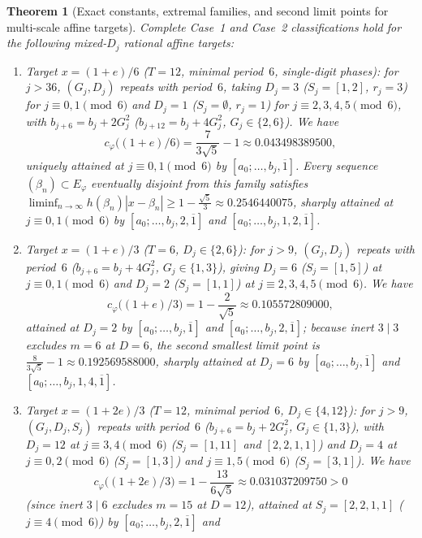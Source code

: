 \documentclass[11pt]{amsart}
\newtheorem{theorem}{Theorem}[section]
\theoremstyle{definition}
\theoremstyle{remark}
\numberwithin{equation}{section}
\begin{document}
\begin{theorem}[Exact constants, extremal families, and second limit points for multi-scale affine targets]\label{thm:golden-multiscale-exact}
Complete Case~1 and Case~2 classifications hold for the following mixed-$D_j$
rational affine targets:
\begin{enumerate}
\item[(i)] \emph{Target $x=(1+e)/6$ ($T=12$, minimal period~$6$, single-digit phases):}
      for $j>36$, $(G_j,D_j)$ repeats with period~$6$, taking $D_j=3$
      ($S_j=[1,2]$, $r_j=3$) for $j\equiv0,1\pmod6$ and $D_j=1$ ($S_j=\emptyset$,
      $r_j=1$) for $j\equiv2,3,4,5\pmod6$, with $b_{j+6}=b_j+2G_j^2$
      ($b_{j+12}=b_j+4G_j^2$, $G_j\in\{2,6\}$). We have
      \[
       c_\varphi\bigl((1+e)/6\bigr)=\frac{7}{3\sqrt5}-1\approx 0.043498389500,
      \]
      uniquely attained at $j\equiv0,1\pmod6$ by $[a_0;\ldots,b_j,\overline1]$.
      Every sequence $(\beta_n)\subset E_\varphi$ eventually disjoint from this
      family satisfies $\liminf_{n\to\infty}h(\beta_n)|x-\beta_n|\ge 1-\frac{\sqrt5}{3}\approx 0.2546440075$,
      sharply attained at $j\equiv0,1\pmod6$ by $[a_0;\ldots,b_j,2,\overline1]$
      and $[a_0;\ldots,b_j,1,2,\overline1]$.
\item[(ii)] \emph{Target $x=(1+e)/3$ ($T=6$, $D_j\in\{2,6\}$):}
      for $j>9$, $(G_j,D_j)$ repeats with period~$6$ ($b_{j+6}=b_j+4G_j^2$,
      $G_j\in\{1,3\}$), giving $D_j=6$ ($S_j=[1,5]$) at $j\equiv0,1\pmod6$ and
      $D_j=2$ ($S_j=[1,1]$) at $j\equiv2,3,4,5\pmod6$. We have
      \[
       c_\varphi\bigl((1+e)/3\bigr)=1-\frac{2}{\sqrt5}\approx 0.105572809000,
      \]
      attained at $D_j=2$ by $[a_0;\ldots,b_j,\overline1]$ and
      $[a_0;\ldots,b_j,2,\overline1]$; because inert $3\mid3$ excludes $m=6$
      at $D=6$, the second smallest limit point is
      $\frac{8}{3\sqrt5}-1\approx 0.192569588000$, sharply attained at $D_j=6$
      by $[a_0;\ldots,b_j,\overline1]$ and $[a_0;\ldots,b_j,1,4,\overline1]$.
\item[(iii)] \emph{Target $x=(1+2e)/3$ ($T=12$, minimal period~$6$, $D_j\in\{4,12\}$):}
      for $j>9$, $(G_j,D_j,S_j)$ repeats with period~$6$ ($b_{j+6}=b_j+2G_j^2$,
      $G_j\in\{1,3\}$), with $D_j=12$ at $j\equiv3,4\pmod6$ ($S_j=[1,11]$ and $[2,2,1,1]$)
      and $D_j=4$ at $j\equiv0,2\pmod6$ ($S_j=[1,3]$) and $j\equiv1,5\pmod6$
      ($S_j=[3,1]$). We have
      \[
       c_\varphi\bigl((1+2e)/3\bigr)=1-\frac{13}{6\sqrt5}\approx 0.031037209750>0
      \]
      (since inert $3\mid6$ excludes $m=15$ at $D=12$), attained at
      $S_j=[2,2,1,1]$ ($j\equiv4\pmod6$) by $[a_0;\ldots,b_j,2,\overline1]$ and

\end{enumerate}
\end{theorem}
\end{document}
